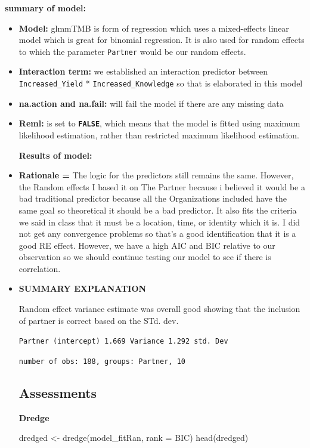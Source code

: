 \documentclass[
  letterpaper,
  DIV=11,
  numbers=noendperiod]{scrartcl}
\newenvironment{Shaded}{\begin{snugshade}}{\end{snugshade}}
\newcommand{\AttributeTok}[1]{\textcolor[rgb]{0.40,0.45,0.13}{#1}}
\newcommand{\FunctionTok}[1]{\textcolor[rgb]{0.28,0.35,0.67}{#1}}
\newcommand{\NormalTok}[1]{\textcolor[rgb]{0.00,0.23,0.31}{#1}}
\newcommand{\OtherTok}[1]{\textcolor[rgb]{0.00,0.23,0.31}{#1}}
\newcommand{\StringTok}[1]{\textcolor[rgb]{0.13,0.47,0.30}{#1}}
\begin{document}
\textbf{summary of model:}

\begin{itemize}
\item
  \textbf{Model:} glmmTMB is form of regression which uses a
  mixed-effects linear model which is great for binomial regression. It
  is also used for random effects to which the parameter
  \texttt{Partner} would be our random effects.
\item
  \textbf{Interaction term:} we established an interaction predictor
  between \texttt{Increased\_Yield} * \texttt{Increased\_Knowledge} so
  that is elaborated in this model
\item
  \textbf{na.action and na.fail:} will fail the model if there are any
  missing data
\item
  \textbf{Reml:} is set to \textbf{\texttt{FALSE}}, which means that the
  model is fitted using maximum likelihood estimation, rather than
  restricted maximum likelihood estimation.

  \textbf{Results of model:}
\item
  \textbf{Rationale =} The logic for the predictors still remains the
  same. However, the Random effects I based it on The Partner because i
  believed it would be a bad traditional predictor because all the
  Organizations included have the same goal so theoretical it should be
  a bad predictor. It also fits the criteria we said in class that it
  must be a location, time, or identity which it is. I did not get any
  convergence problems so that's a good identification that it is a good
  RE effect. However, we have a high AIC and BIC relative to our
  observation so we should continue testing our model to see if there is
  correlation.
\item
  \textbf{SUMMARY EXPLANATION}

  Random effect variance estimate was overall good showing that the
  inclusion of partner is correct based on the STd. dev.

  \texttt{Partner\ (intercept)\ 1.669\ Variance\ 1.292\ std.\ Dev}

  \texttt{number\ of\ obs:\ 188,\ groups:\ Partner,\ 10}

  \hypertarget{assessments}{%
  \subsection{Assessments}\label{assessments}}

  \textbf{Dredge}

\begin{Shaded}
\begin{Highlighting}[]
\NormalTok{dredged }\OtherTok{\textless{}{-}} \FunctionTok{dredge}\NormalTok{(model\_fitRan, }\AttributeTok{rank =} \StringTok{\textquotesingle{}BIC\textquotesingle{}}\NormalTok{)}
\FunctionTok{head}\NormalTok{(dredged)}
\end{Highlighting}
\end{Shaded}


\end{itemize}
\end{document}
